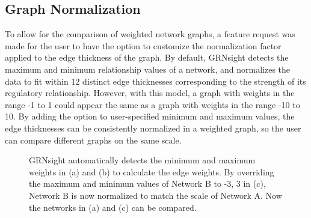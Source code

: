 \documentclass[sigconf,review]{acmart}
\begin{document}
\subsection{Graph Normalization}

To allow for the comparison of weighted network graphs, a feature request was made for the user to have the option to customize the normalization factor applied to the edge thickness of the graph. By default, GRNsight detects the maximum and minimum relationship values of a network, and normalizes the data to fit within 12 distinct edge thicknesses corresponding to the strength of its regulatory relationship. However, with this model, a graph with weights in the range -1 to 1 could appear the same as a graph with weights in the range -10 to 10. By adding the option to user-specified minimum and maximum values, the edge thicknesses can be consistently normalized in a weighted graph, so the user can compare different graphs on the same scale. 

\begin{figure}[h]
    \centering
    \caption{GRNsight automatically detects the minimum and maximum weights in (a) and (b) to calculate the edge weights. By overriding the maximum and minimum values of Network B to -3, 3 in (c), Network B is now normalized to match the scale of Network A. Now the networks in (a) and (c) can be compared.}
    \label{fig:network-screenshots}
\end{figure}
\end{document}
